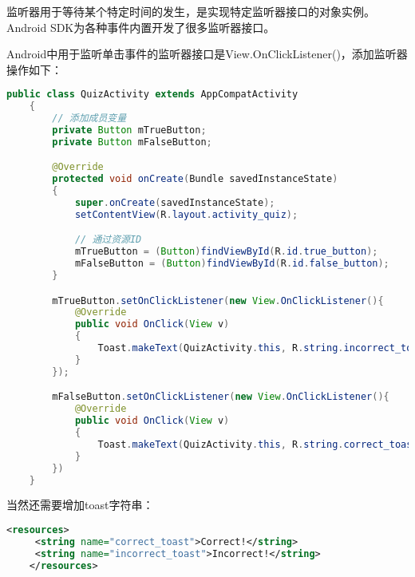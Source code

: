 \documentclass[a4paper,left=2.5cm,right=2.5cm,11pt]{article}
\begin{document}
	监听器用于等待某个特定时间的发生，是实现特定监听器接口的对象实例。Android SDK为各种事件内置开发了很多监听器接口。\par

	Android中用于监听单击事件的监听器接口是View.OnClickListener()，添加监听器操作如下：
	\begin{lstlisting}[language = java]
	public class QuizActivity extends AppCompatActivity
	{
		// 添加成员变量
		private Button mTrueButton;
		private Button mFalseButton;

		@Override
		protected void onCreate(Bundle savedInstanceState)
		{
			super.onCreate(savedInstanceState);
			setContentView(R.layout.activity_quiz);

			// 通过资源ID
			mTrueButton = (Button)findViewById(R.id.true_button);
			mFalseButton = (Button)findViewById(R.id.false_button);
		}

		mTrueButton.setOnClickListener(new View.OnClickListener(){
			@Override
			public void OnClick(View v)
			{
				Toast.makeText(QuizActivity.this, R.string.incorrect_toast, Toast.LENGTH_SHORT).show();
			}
		});

		mFalseButton.setOnClickListener(new View.OnClickListener(){
			@Override
			public void OnClick(View v)
			{
				Toast.makeText(QuizActivity.this, R.string.correct_toast, Toast.LENGTH_SHORT).show();
			}
		})
	}
	\end{lstlisting}

	当然还需要增加toast字符串：
	\begin{lstlisting}[language = xml]
	<resources>
	 <string name="correct_toast">Correct!</string>
	 <string name="incorrect_toast">Incorrect!</string>
	</resources>
	\end{lstlisting}
\end{document}
